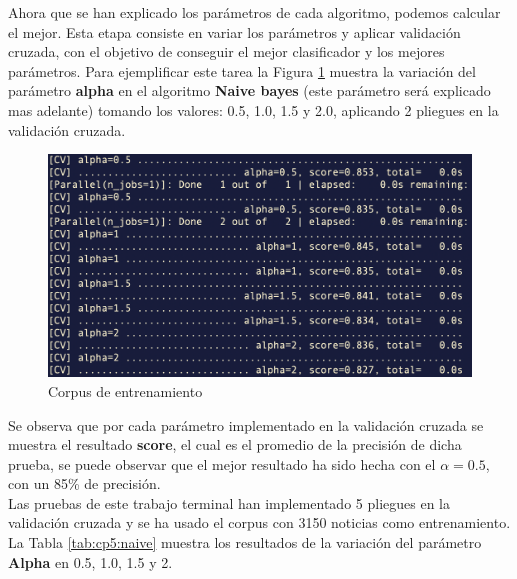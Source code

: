 Ahora que se han explicado los parámetros de cada algoritmo, podemos calcular el mejor. Esta etapa consiste en variar los parámetros y aplicar validación cruzada, con el objetivo de conseguir el mejor clasificador y los mejores parámetros. Para ejemplificar este tarea la Figura \ref{fig:cp5:gridbayes} muestra la variación del parámetro \textbf{alpha} en el algoritmo \textbf{Naive bayes} (este parámetro será explicado mas adelante) tomando los valores: 0.5, 1.0, 1.5 y 2.0, aplicando 2 pliegues en la validación cruzada.\\

\begin{figure}[h]
\centering
\includegraphics[scale=.5]{imagenes/capitulo5/gridbayes.png}
\caption{Corpus de entrenamiento}
\label{fig:cp5:gridbayes}
\end{figure}

Se observa que por cada parámetro implementado en la validación cruzada se muestra el resultado \textbf{score}, el cual es el promedio de la precisión de dicha prueba, se puede observar que el mejor resultado ha sido hecha con el $\alpha=0.5$, con un 85\% de precisión.\\

Las pruebas de este trabajo terminal han implementado 5 pliegues en la validación cruzada y se ha usado el corpus con 3150 noticias como entrenamiento.\\

La Tabla \ref{tab:cp5:naive} muestra los resultados de la variación del parámetro \textbf{Alpha} en 0.5, 1.0, 1.5 y 2.


